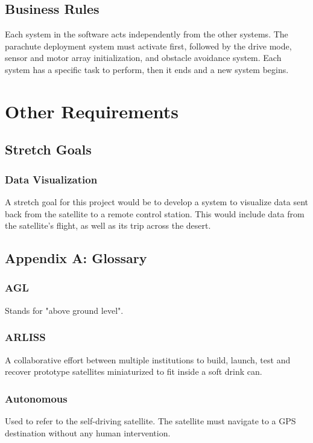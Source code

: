 \documentclass{scrreprt}
\begin{document}
\section{Business Rules}
Each system in the software acts independently from the other systems. The parachute deployment system must activate first, followed by the drive mode, sensor and motor array initialization, and obstacle avoidance system. Each system has a specific task to perform, then it ends and a new system begins.


\chapter{Other Requirements}

\section{Stretch Goals}

\subsection{Data Visualization}
A stretch goal for this project would be to develop a system to visualize data sent back from the satellite to a remote control station. This would include data from the satellite's flight, as well as its trip across the desert.

\section{Appendix A: Glossary}

\subsection{AGL}
Stands for "above ground level".

\subsection{ARLISS}
A collaborative effort between multiple institutions to build, launch, test and recover prototype satellites miniaturized to fit inside a soft drink can.

\subsection{Autonomous}
Used to refer to the self-driving satellite. The satellite must navigate to a GPS destination without any human intervention.
\end{document}
